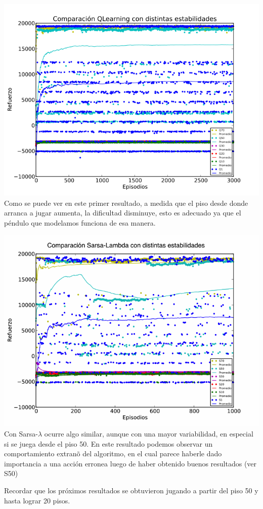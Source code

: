 \documentclass[11pt, a4paper]{article}
\newcommand{\slambda}{Sarsa-$\lambda$ }
\begin{document}
\includegraphics[scale=0.6]{Graficos/estabilidadesQ}
Como se puede ver en este primer resultado, a medida que el piso desde donde arranca a jugar aumenta, la dificultad disminuye, esto es adecuado ya que el p\'endulo que modelamos funciona de esa manera.

\includegraphics[scale=0.6]{Graficos/estabilidadesS}
Con \slambda ocurre algo similar, aunque con una mayor variabilidad, en especial si se juega desde el piso 50. En este resultado podemos observar un comportamiento extran\~o del algoritmo, en el cual parece haberle dado importancia a una acci\'on erronea luego de haber obtenido buenos resultados (ver S50)

\newpage
Recordar que los pr\'oximos resultados se obtuvieron jugando a partir del piso 50 y hasta lograr 20 pisos.
\end{document}
